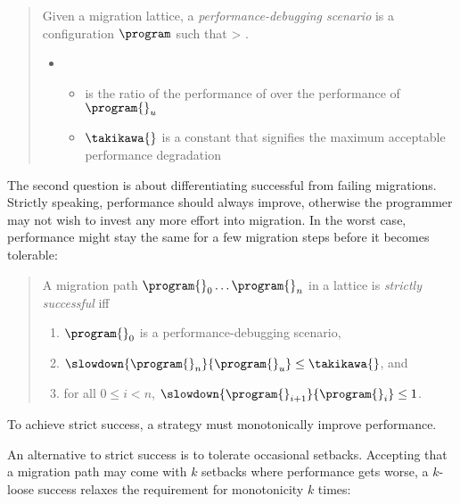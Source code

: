 \begin{quote} \em

Given a migration lattice, a \emph{performance-debugging scenario} is a
  configuration $\program$ such that  > \takikawa{}.
  \begin{itemize} \item[] \begin{itemize}
    \item
       is the ratio of the performance of
      \program{} over the performance of $\program{}_u$
    \item
      $\takikawa{}$ is a
      constant that signifies the maximum acceptable performance degradation
  \end{itemize} \end{itemize}
\end{quote}

The second question is about differentiating successful from failing migrations.
Strictly speaking, performance should
always improve, otherwise the programmer may not wish to invest any more effort
into migration.
In the worst case, performance might stay the same for a few
migration steps before it becomes tolerable:

\begin{quote} \em

A migration path ${\program{}_0} \ldots {\program{}_n}$ in a lattice 
is \emph{strictly successful}
iff
\begin{enumerate}
  \item $\program{}_0$ is a performance-debugging scenario,
  \item $\slowdown{\program{}_n}{\program{}_u} \leq \takikawa{}$, and 
  \item for all $0 \leq i < n$, $\slowdown{\program{}_{i+1}}{\program{}_{i}} \leq 1$.
 \end{enumerate} 
\end{quote}
To achieve strict success, a strategy must monotonically improve performance.

An alternative to strict success is to tolerate occasional setbacks.
Accepting that a migration path may come with $k$ setbacks where performance
gets worse, a $k$-loose success relaxes the requirement for monotonicity $k$
times:

